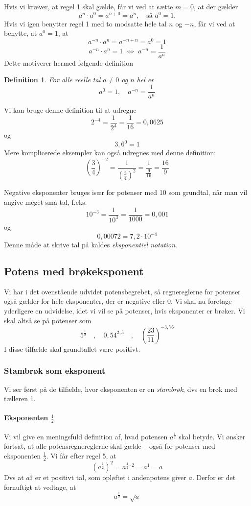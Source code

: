 \documentclass[12pt,oneside,a4paper]{article}
\theoremstyle{plain}
\newtheorem*{mydef}{Definition}
\begin{document}
Hvis vi kræver, at regel 1 skal gælde, får vi ved at sætte $m=0$, at der gælder
$$
a^n \cdot a^0 = a^{n+0} = a^n,\quad \mbox{så $a^0=1$.}
$$
Hvis vi igen benytter regel 1 med to modsatte hele tal $n$ og $-n$, får vi ved at benytte, at $a^0=1$, at
$$
a^{-n} \cdot a^n = a^{-n+n} = a^0 = 1
$$
$$
a^{-n} \cdot a^n = 1 \,\,\Leftrightarrow \,\,a^{-n} = \frac{1}{a^n}
$$
Dette motiverer hermed følgende definition
\begin{mydef}
    For alle reelle tal $a\neq 0$ og $n$ hel er
    $$
    a^0 = 1,\quad a^{-n} = \frac{1}{a^n}
    $$
\end{mydef}

Vi kan bruge denne definition til at udregne
$$
2^{-4} = \frac{1}{2^4} = \frac{1}{16} = 0,0625
$$
og
$$
3,6^0 = 1
$$
Mere komplicerede eksempler kan også udregnes med denne definition:
$$
\left(\frac{3}{4}\right)^{-2} = \frac{1}{\left(\frac{3}{4}\right)^2} = \frac{1}{\frac{9}{16}} = \frac{16}{9}
$$

Negative eksponenter bruges især for potenser med 10 som grundtal, når man vil angive meget små tal, f.eks.
$$
10^{-3} = \frac{1}{10^3} = \frac{1}{1000} = 0,001
$$
og
$$
0,00072 = 7,2\cdot 10^{-4}
$$
Denne måde at skrive tal på kaldes {\em eksponentiel notation}.


\subsection*{Potens med brøkeksponent}
Vi har i det ovenstående udvidet potensbegrebet, så regnereglerne for potenser også gælder for hele eksponenter, der er negative eller 0. Vi skal nu foretage yderligere en udvidelse, idet vi vil se på potenser, hvis eksponenter er brøker. Vi skal altså se på potenser som
$$
5^{\frac12} \quad,\quad 0,54^{2,5} \quad,\quad
\left(\frac{23}{11}\right)^{-3,76}
$$
I disse tilfælde skal grundtallet være positivt.

\subsubsection*{Stambrøk som eksponent}
Vi ser først på de tilfælde, hvor eksponenten er en {\em stambrøk}, dvs en brøk
med tælleren 1.

\paragraph*{Eksponenten $\frac12$}
Vi vil give en meningsfuld definition af, hvad potensen $a^{\frac12}$ skal
betyde.  Vi ønsker fortsat, at alle potensregnereglerne skal gælde -- også for
potenser med eksponenten $\frac12$. Vi får efter regel 5, at 
$$
\left(a^{\frac12}\right)^2 = a^{\frac12 \cdot 2} = a^1 = a
$$
Dvs at $a^\frac12$ er et positivt tal, som opløftet i andenpotens giver $a$.
Derfor er det fornuftigt at vedtage, at
$$
a^\frac12 = \sqrt{a}
$$
\end{document}
